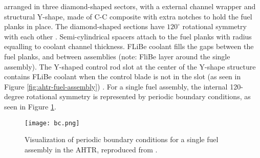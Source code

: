 arranged in three diamond-shaped sectors, with a external channel wrapper and 
structural Y-shape, made of C-C composite with extra notches to hold the fuel 
planks in place. 
The diamond-shaped sections have $120^\circ{}$ rotational symmetry with each other 
\cite{varma_ahtr_2012,ramey_monte_2018,noauthor_fluoride_nodate}. 
Semi-cylindrical spacers attach to the fuel planks with radius equalling to 
coolant channel thickness. 
\gls{FLiBe} coolant fills the gaps between the fuel planks, and between 
assemblies (note: FliBe layer around the single assembly). 
The Y-shaped control rod slot at the center of the Y-shape structure contains 
\gls{FLiBe} coolant when the control blade is not in the slot (as seen in 
Figure \ref{fig:ahtr-fuel-assembly})
\cite{varma_ahtr_2012,ramey_monte_2018,noauthor_fluoride_nodate}.
For a single fuel assembly, the internal 120-degree rotational symmetry is 
represented by periodic boundary conditions, as seen in Figure \ref{fig:bc}. 
\begin{figure}[]
    \centering
    \texttt{[image: bc.png]} 
    \caption{Visualization of periodic boundary conditions for a single fuel 
    assembly in the \gls{AHTR}, reproduced from \cite{noauthor_fluoride_nodate}.}
    \label{fig:bc}
\end{figure}

